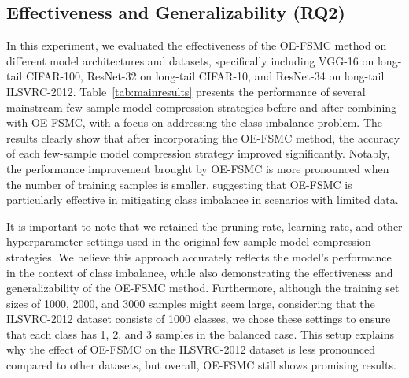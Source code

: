 \documentclass[twoside,11pt]{article}
\begin{document}
\subsection{Effectiveness and Generalizability (RQ2)}
In this experiment, we evaluated the effectiveness of the OE-FSMC method on different model architectures and datasets, specifically including VGG-16 on long-tail CIFAR-100, ResNet-32 on long-tail CIFAR-10, and ResNet-34 on long-tail ILSVRC-2012. Table~\ref{tab:mainresults} presents the performance of several mainstream few-sample model compression strategies before and after combining with OE-FSMC, with a focus on addressing the class imbalance problem. The results clearly show that after incorporating the OE-FSMC method, the accuracy of each few-sample model compression strategy improved significantly. Notably, the performance improvement brought by OE-FSMC is more pronounced when the number of training samples is smaller, suggesting that OE-FSMC is particularly effective in mitigating class imbalance in scenarios with limited data.

It is important to note that we retained the pruning rate, learning rate, and other hyperparameter settings used in the original few-sample model compression strategies. We believe this approach accurately reflects the model’s performance in the context of class imbalance, while also demonstrating the effectiveness and generalizability of the OE-FSMC method. Furthermore, although the training set sizes of 1000, 2000, and 3000 samples might seem large, considering that the ILSVRC-2012 dataset consists of 1000 classes, we chose these settings to ensure that each class has 1, 2, and 3 samples in the balanced case. This setup explains why the effect of OE-FSMC on the ILSVRC-2012 dataset is less pronounced compared to other datasets, but overall, OE-FSMC still shows promising results.
\end{document}

